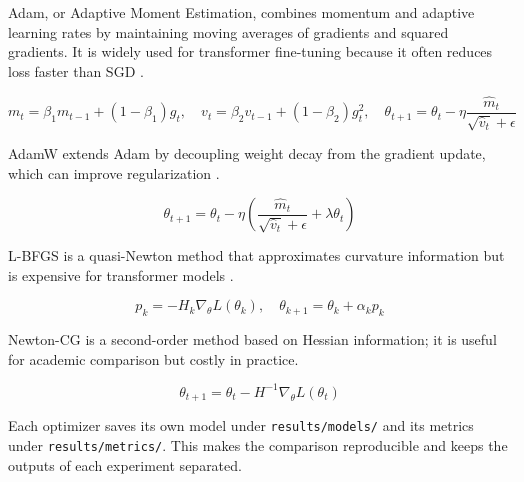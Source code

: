 Adam, or Adaptive Moment Estimation, combines momentum and adaptive learning
rates by maintaining moving averages of gradients and squared gradients. It is
widely used for transformer fine-tuning because it often reduces loss faster than
SGD \cite{adam}.

\[
m_t = \beta_1m_{t-1} + (1-\beta_1)g_t, \quad v_t = \beta_2v_{t-1} + (1-\beta_2)g_t^2, \quad \theta_{t+1} = \theta_t - \eta\frac{\hat{m}_t}{\sqrt{\hat{v}_t}+\epsilon}
\]

AdamW extends Adam by decoupling weight decay from the gradient
update, which can improve regularization \cite{adamw}.

\[
\theta_{t+1} = \theta_t - \eta\left(\frac{\hat{m}_t}{\sqrt{\hat{v}_t}+\epsilon} + \lambda\theta_t\right)
\]

L-BFGS is a quasi-Newton method that
approximates curvature information but is expensive for transformer models
\cite{lbfgs}.

\[
p_k = -H_k \nabla_{\theta}L(\theta_k), \quad \theta_{k+1} = \theta_k + \alpha_k p_k
\]

Newton-CG is a second-order method based on Hessian information; it is useful for
academic comparison but costly in practice.

\[
\theta_{t+1} = \theta_t - H^{-1}\nabla_{\theta}L(\theta_t)
\]

Each optimizer saves its own model under \texttt{results/models/} and its metrics
under \texttt{results/metrics/}. This makes the comparison reproducible and keeps
the outputs of each experiment separated.
